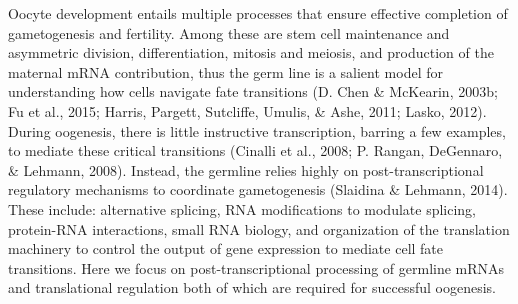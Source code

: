 \documentclass[12pt,oneside]{reedthesis}
\begin{document}
Oocyte development entails multiple processes that ensure effective
completion of gametogenesis and fertility. Among these are stem cell
maintenance and asymmetric division, differentiation, mitosis and
meiosis, and production of the maternal mRNA contribution, thus the germ
line is a salient model for understanding how cells navigate fate
transitions (D. Chen \& McKearin, 2003b; Fu et al., 2015; Harris, Pargett, Sutcliffe, Umulis, \& Ashe, 2011; Lasko, 2012).
During oogenesis, there is little instructive transcription, barring a
few examples, to mediate these critical transitions (Cinalli et al., 2008; P. Rangan, DeGennaro, \& Lehmann, 2008). Instead, the germline relies highly on
post-transcriptional regulatory mechanisms to coordinate gametogenesis
(Slaidina \& Lehmann, 2014). These include: alternative splicing, RNA
modifications to modulate splicing, protein-RNA interactions, small RNA
biology, and organization of the translation machinery to control the
output of gene expression to mediate cell fate transitions. Here we
focus on post-transcriptional processing of germline mRNAs and
translational regulation both of which are required for successful
oogenesis.
\end{document}
